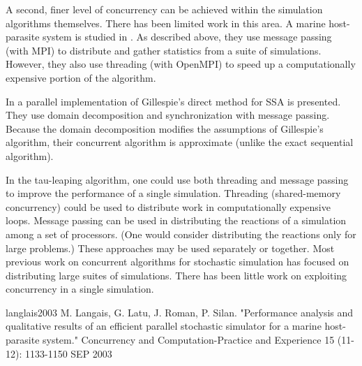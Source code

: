 A second, finer level of concurrency can be achieved within the simulation
algorithms themselves.  There has been limited work in this area.  A marine
host-parasite system is studied in \cite{langlais2003}.  As described above,
they use message passing (with MPI) to distribute and
gather statistics from a suite of simulations.  However, they also use 
threading (with OpenMPI) to speed up a computationally expensive portion 
of the algorithm.  

In \cite{ridwan2004} a parallel implementation of Gillespie's direct
method for SSA is presented.  They use domain decomposition and 
synchronization with message passing.  Because the domain decomposition
modifies the assumptions of Gillespie's algorithm, their concurrent
algorithm is approximate (unlike the exact sequential algorithm).

In the tau-leaping algorithm, one could use both threading and message 
passing to improve the performance of a single simulation.  Threading 
(shared-memory concurrency) could be used to distribute work in 
computationally expensive loops.  Message passing can be used in 
distributing the reactions of a simulation among a set of processors.
(One would consider distributing the reactions only for large problems.)
These approaches may be used separately or together.  Most previous
work on concurrent algorithms for stochastic simulation has focused
on distributing large suites of simulations.  There has been little 
work on exploiting concurrency in a single simulation.




langlais2003
M. Langais, G. Latu, J. Roman, P. Silan.
"Performance analysis and qualitative results of an efficient parallel 
stochastic simulator for a marine host-parasite system."
Concurrency and Computation-Practice and Experience 15 (11-12): 1133-1150 SEP 2003 

